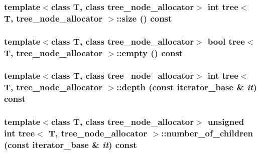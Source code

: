 \hypertarget{classtree_219ff1bfc99f78fd9a2db71f41891523}{
\subsubsection{\setlength{\rightskip}{0pt plus 5cm}template$<$class T, class tree\_\-node\_\-allocator$>$ int {\bf tree}$<$ T, tree\_\-node\_\-allocator $>$::size () const}}
\label{classtree_219ff1bfc99f78fd9a2db71f41891523}


\hypertarget{classtree_e9f7fd30c51443d46ca8941d5bc06da2}{
\subsubsection{\setlength{\rightskip}{0pt plus 5cm}template$<$class T, class tree\_\-node\_\-allocator$>$ bool {\bf tree}$<$ T, tree\_\-node\_\-allocator $>$::empty () const}}
\label{classtree_e9f7fd30c51443d46ca8941d5bc06da2}


\hypertarget{classtree_16c66be75ca89c999a9c4a68497b05a1}{
\subsubsection{\setlength{\rightskip}{0pt plus 5cm}template$<$class T, class tree\_\-node\_\-allocator$>$ int {\bf tree}$<$ T, tree\_\-node\_\-allocator $>$::depth (const {\bf iterator\_\-base} \& {\em it}) const}}
\label{classtree_16c66be75ca89c999a9c4a68497b05a1}


\hypertarget{classtree_96f82a90a3e21e82f486f325b0cf9faa}{
\subsubsection{\setlength{\rightskip}{0pt plus 5cm}template$<$class T, class tree\_\-node\_\-allocator$>$ unsigned int {\bf tree}$<$ T, tree\_\-node\_\-allocator $>$::number\_\-of\_\-children (const {\bf iterator\_\-base} \& {\em it}) const}}
\label{classtree_96f82a90a3e21e82f486f325b0cf9faa}


